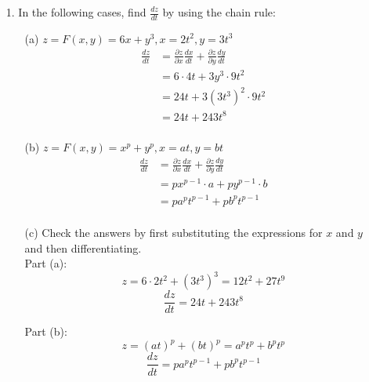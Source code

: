 \documentclass{article}
\begin{document}
\begin{enumerate}
    
    \item[1.] In the following cases, find $\frac{dz}{dt}$ by using the chain rule:
        \begin{enumerate}
            \item[(a)] $z = F(x, y) = 6x + y^3, x = 2t^2, y = 3t^3$ 
                \begin{equation*}
                \begin{aligned}
                    \frac{dz}{dt} 
                    &= \frac{\partial z}{\partial x}\frac{dx}{dt} + \frac{\partial z}{\partial y}\frac{dy}{dt} \\
                    &= 6 \cdot 4t + 3y^3 \cdot 9t^2 \\
                    &= 24t + 3(3t^3)^2 \cdot 9t^2 \\
                    &= 24t + 243t^8 \\
                \end{aligned}
                \end{equation*}
      
            \item[(b)] $z = F(x, y) = x^p + y^p, x = at, y = bt$
                \begin{equation*}
                \begin{aligned}
                    \frac{dz}{dt} 
                    &= \frac{\partial z}{\partial x}\frac{dx}{dt} + \frac{\partial z}{\partial y}\frac{dy}{dt} \\
                    &= px^{p-1} \cdot a + py^{p-1} \cdot b \\
                    &= pa^pt^{p-1} + pb^pt^{p-1} \\
                \end{aligned}
                \end{equation*}
                
            \item[(c)] Check the answers by first substituting the expressions for $x$ and $y$ and then differentiating. \\
            
            Part (a): 
            $$z = 6 \cdot 2t^2 + (3t^3)^3 = 12t^2 + 27t^9$$
            $$\frac{dz}{dt} = 24t + 243t^8$$
            
            Part (b): 
            $$z = (at)^p + (bt)^p = a^pt^p + b^pt^p$$
            $$ \frac{dz}{dt} = pa^pt^{p-1} + pb^pt^{p-1}$$
            

\end{enumerate}
\end{enumerate}
\end{document}
